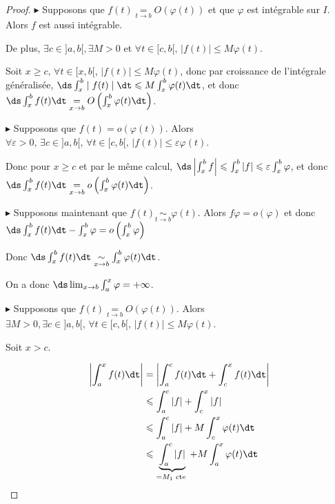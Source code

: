 \begin{proof}
    $\blacktriangleright$ Supposons que $f(t) \underset{t \to b }{=} O(\varphi(t))$ et que $\varphi$ est intégrable sur $I$. 
    Alors $f$ est aussi intégrable. 

    De plus, $\exists c \in ]a, b[, \exists M >0$ et $\forall t \in [c, b[, \, |f(t)| \leqslant M \varphi(t)$.

    Soit $x \geqslant c, \, \forall t \in [x, b[$, $|f(t)| \leqslant M \varphi(t)$, donc
    par croissance de l'intégrale généralisée, $ \ds \int_{x }^{b } \mid f(t) \mid \dt \leqslant M \int_{x }^{b } \varphi(t) \dt$, et donc
    $\ds \int_{x }^{b } f(t) \dt \underset{x \to b }{=} O\left( \int_{x }^{b } \varphi(t) \dt \right)$.

    $\blacktriangleright$ Supposons que $f(t) = o(\varphi(t))$. 
    Alors $\forall \varepsilon > 0, \, \exists c \in ]a, b[, \, \forall t \in [c, b[, \, |f(t)| \leqslant \varepsilon \varphi(t)$.

    Donc pour $x \geqslant c$ et par le même calcul, $\ds \left| \int_{x }^{b } f \right| \leqslant \int_{x }^{b } |f| \leqslant \varepsilon \int_{x }^{b } \varphi$, 
    et donc $\ds \int_{x }^{b } f(t) \dt \underset{x \to b }{=} o\left( \int_{x }^{b } \varphi(t) \dt \right)$.

    $\blacktriangleright$ Supposons maintenant que $f(t) \underset{t \to b }{\sim    } \varphi(t)$. 
    Alors $f \varphi = o(\varphi)$ et donc 
    $\ds \int_{x }^{b } f(t) \dt  - \int_{x }^{b } \varphi = o \left( \int_{x }^{b } \varphi \right)$

    Donc $\ds \int_{x }^{b } f(t) \dt \underset{x \to b }{\sim    } \int_{x }^{b } \varphi(t) \dt$.



    \svspace On a donc $\ds \lim_{x \to b   } \int_a^x \varphi = + \infty$. 

    $\blacktriangleright$ Supposons que $f(t) \underset{t \to b }{=} O(\varphi(t))$.
    Alors $\exists M > 0, \exists c \in ]a, b[, \, \forall t \in [c, b[, \, |f(t)| \leqslant M \varphi(t)$.

    Soit $x > c$. 

    \begin{align}
        \left| \int_a^x f(t) \dt \right| & = \left| \int_a^c f(t) \dt + \int_c^x f(t) \dt \right| \\
        & \leqslant \int_a^c |f| + \int_c^x |f| \\
        & \leqslant \int_a^c |f| + M \int_c^x \varphi(t) \dt \\
        & \leqslant \underbrace{\int_a^c |f|}_{ = M_1 \text{ cte }} + M \int_a^x \varphi(t) \dt
    \end{align}


\end{proof}
